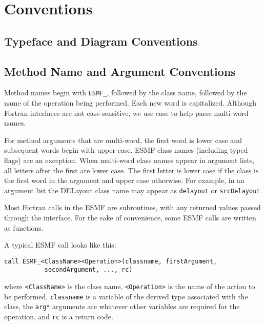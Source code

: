 \section{Conventions}
\label{sec:conventions}

\subsection{Typeface and Diagram Conventions}



\subsection{Method Name and Argument Conventions}

Method names begin with {\tt ESMF\_}, followed by the class name, 
followed by the name of the operation being performed.  Each new 
word is capitalized.  Although Fortran interfaces are not case-sensitive,
we use case to help parse multi-word names.  

For method arguments that are multi-word, the first word is lower
case and subsequent words begin with upper case.  ESMF class 
names (including typed flags) are an exception.  When multi-word 
class names appear in argument lists, all letters after the first 
are lower case.  The first letter is lower case if the class is the
first word in the argument and upper case otherwise.  For 
example, in an argument list the DELayout class name may appear 
as {\tt delayout} or {\tt srcDelayout}.

Most Fortran calls in the ESMF are subroutines, with 
any returned values passed through the interface.  For the sake of 
convenience, some ESMF calls are written as functions.

A typical ESMF call looks like this:

\begin{verbatim}
call ESMF_<ClassName><Operation>(classname, firstArgument, 
           secondArgument, ..., rc)
\end{verbatim}

where \newline
{\tt <ClassName>} is the class name, \newline
{\tt <Operation>} is the name of the action to be performed, \newline 
{\tt classname} is a variable of the derived type associated 
with the class, \newline
the {\tt arg*} arguments are whatever other variables are required 
for the operation, \newline
and {\tt rc} is a return code. \newline


